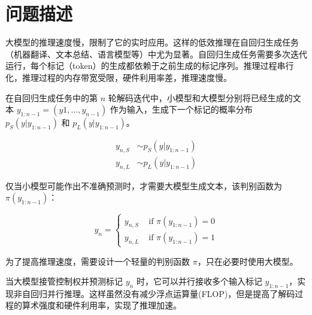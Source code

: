 
\chapter{问题描述}

大模型的推理速度慢，限制了它的实时应用。这样的低效推理在自回归生成任务（机器翻译、文本总结、语言模型等）中尤为显著。自回归生成任务需要多次迭代运行，每个标记（token）的生成都依赖于之前生成的标记序列。推理过程串行化，推理过程的内存带宽受限，硬件利用率差，推理速度慢。

在自回归生成任务中的第 $n$ 轮解码迭代中，小模型和大模型分别将已经生成的文本 $y_{1:n-1}=(y1,\dots,y_{n-1})$ 作为输入，生成下一个标记的概率分布 $p_S(y|y_{1:n-1})$ 和 $p_L(y|y_{1:n-1})$。

\begin{align}
    y_{n,S} & \sim p_S(y|y_{1:n-1}) \\
    y_{n,L} & \sim p_L(y|y_{1:n-1})
\end{align}

仅当小模型可能作出不准确预测时，才需要大模型生成文本，该判别函数为$\pi(y_{1:n-1})$：

\begin{equation}
    y_n= \begin{cases}y_{n, S} & \text { if } \pi\left(y_{1: n-1}\right)=0 \\ y_{n, L} & \text { if } \pi\left(y_{1: n-1}\right)=1\end{cases}
\end{equation}

为了提高推理速度，需要设计一个轻量的判别函数 $\pi$，只在必要时使用大模型。

当大模型接管控制权并预测标记 $y_n$ 时，它可以并行接收多个输入标记 $y_{1:n-1}$，实现非自回归并行推理。这样虽然没有减少浮点运算量(FLOP)，但是提高了解码过程的算术强度和硬件利用率，实现了推理加速。
